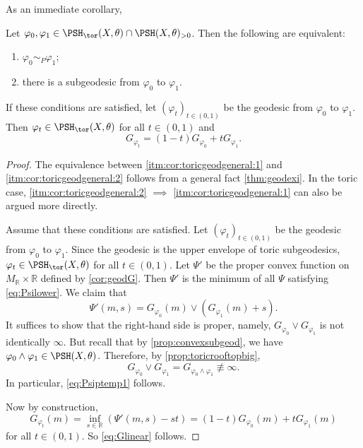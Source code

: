 As an immediate corollary,
\begin{corollary}\label{cor:toricgeodgeneral}
    Let $\varphi_0,\varphi_1\in \PSH_{\tor}(X,\theta)\cap \PSH(X,\theta)_{>0}$.
    Then the following are equivalent:
    \begin{enumerate}
        \item\label{itm:cor:toricgeodgeneral:1} $\varphi_0\sim_P \varphi_1$;
        \item\label{itm:cor:toricgeodgeneral:2} there is a subgeodesic from $\varphi_0$ to $\varphi_1$.
   \end{enumerate}
    If these conditions are satisfied, let $(\varphi_t)_{t\in (0,1)}$ be the geodesic from $\varphi_0$ to $\varphi_1$. Then $\varphi_t\in \PSH_{\tor}(X,\theta)$ for all $t\in (0,1)$ and
    \begin{equation}\label{eq:Glinear}
    G_{\varphi_t}=(1-t)G_{\varphi_0}+tG_{\varphi_1}.
    \end{equation}
\end{corollary}
\begin{proof}
    The equivalence between \ref{itm:cor:toricgeodgeneral:1} and \ref{itm:cor:toricgeodgeneral:2} follows from a general fact \cref{thm:geodexi}. In the toric case, \ref{itm:cor:toricgeodgeneral:2} $\implies$ \ref{itm:cor:toricgeodgeneral:1} can also be argued more directly.

    Assume that these conditions are satisfied. Let $(\varphi_t)_{t\in (0,1)}$ be the geodesic from $\varphi_0$ to $\varphi_1$. Since the geodesic is the upper envelope of toric subgeodesics, $\varphi_t\in \PSH_{\tor}(X,\theta)$ for all $t\in (0,1)$. Let $\Psi'$ be the proper convex function on $M_{\mathbb{R}}\times \mathbb{R}$ defined by \cref{cor:geodG}. Then $\Psi'$ is the minimum of all $\Psi$ satisfying \eqref{eq:Psilower}. We claim that
    \begin{equation}\label{eq:Psiptemp1}
    \Psi'(m,s)=G_{\varphi_0}(m)\lor \left(G_{\varphi_1}(m)+s\right).
    \end{equation}
    It suffices to show that the right-hand side is proper, namely, $G_{\varphi_0}\lor G_{\varphi_1}$ is not identically $\infty$. But recall that by \cref{prop:convexsubgeod}, we have $\varphi_0\land \varphi_1\in \PSH(X,\theta)$. Therefore, by \cref{prop:toricrooftopbig},
    \[
    G_{\varphi_0}\lor G_{\varphi_1}=G_{\varphi_0\land \varphi_1}\not\equiv \infty.
    \]
    In particular, \eqref{eq:Psiptemp1} follows.

    Now by construction,
    \[
    G_{\varphi_t}(m)=\inf_{s\in \mathbb{R}} \left( \Psi'(m,s)-st\right)=(1-t)G_{\varphi_0}(m)+tG_{\varphi_1}(m)
    \]
    for all $t\in (0,1)$. So \eqref{eq:Glinear} follows.
\end{proof}


